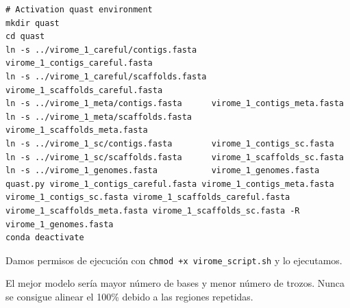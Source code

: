\begin{lstlisting}
# Activation quast environment
mkdir quast
cd quast
ln -s ../virome_1_careful/contigs.fasta   virome_1_contigs_careful.fasta
ln -s ../virome_1_careful/scaffolds.fasta virome_1_scaffolds_careful.fasta
ln -s ../virome_1_meta/contigs.fasta      virome_1_contigs_meta.fasta
ln -s ../virome_1_meta/scaffolds.fasta    virome_1_scaffolds_meta.fasta
ln -s ../virome_1_sc/contigs.fasta        virome_1_contigs_sc.fasta
ln -s ../virome_1_sc/scaffolds.fasta      virome_1_scaffolds_sc.fasta
ln -s ../virome_1_genomes.fasta           virome_1_genomes.fasta
quast.py virome_1_contigs_careful.fasta virome_1_contigs_meta.fasta virome_1_contigs_sc.fasta virome_1_scaffolds_careful.fasta virome_1_scaffolds_meta.fasta virome_1_scaffolds_sc.fasta -R virome_1_genomes.fasta
conda deactivate
\end{lstlisting}

Damos permisos de ejecución con \texttt{chmod +x virome\_script.sh} y lo ejecutamos.

El mejor modelo sería mayor número de bases y menor número de trozos. Nunca se consigue alinear el 100\% debido a las regiones repetidas. 